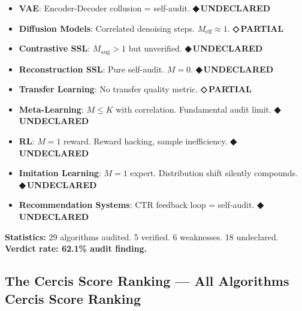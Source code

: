 \documentclass[12pt,a4paper]{article}
\theoremstyle{definition}
\newcommand{\guilty}{{\color{guiltycolor}\textbf{◆\,UNDECLARED}}}
\newcommand{\weakness}{{\color{weakcolor}\textbf{◇\,PARTIAL}}}
\begin{document}
\begin{itemize}[nosep]
    \item \textbf{VAE}: Encoder-Decoder collusion = self-audit. \guilty{}
    \item \textbf{Diffusion Models}: Correlated denoising steps. $M_{\text{eff}} \approx 1$. \weakness{}
    \item \textbf{Contrastive SSL}: $M_{\text{aug}}>1$ but unverified. \guilty{}
    \item \textbf{Reconstruction SSL}: Pure self-audit. $M=0$. \guilty{}
    \item \textbf{Transfer Learning}: No transfer quality metric. \weakness{}
    \item \textbf{Meta-Learning}: $M \le K$ with correlation. Fundamental audit limit. \guilty{}
    \item \textbf{RL}: $M=1$ reward. Reward hacking, sample inefficiency. \guilty{}
    \item \textbf{Imitation Learning}: $M=1$ expert. Distribution shift silently compounds. \guilty{}
    \item \textbf{Recommendation Systems}: CTR feedback loop = self-audit. \guilty{}
\end{itemize}

\medskip
\noindent\textbf{Statistics:} 29 algorithms audited. 5 verified. 6 weaknesses. 18 undeclared. \textbf{Verdict rate: 62.1\% audit finding.}

\subsection{The Cercis Score Ranking — All Algorithms Cercis Score Ranking}
\end{document}
